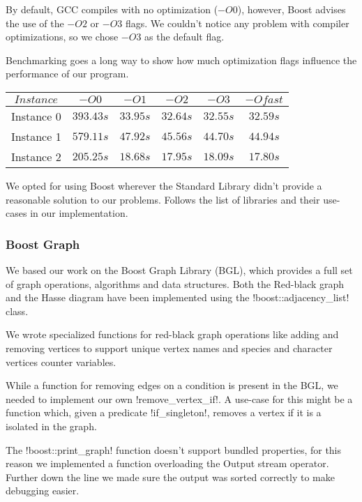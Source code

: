 
By default, GCC compiles with no optimization ($-O0$), however, Boost advises the use of the $-O2$ or $-O3$ flags.
We couldn't notice any problem with compiler optimizations, so we chose $-O3$ as the default flag.

Benchmarking goes a long way to show how much optimization flags influence the performance of our program.

\begin{center}
  \begin{tabular}{c | c c c c c}
    $Instance$ & $-O0$     & $-O1$    & $-O2$    & $-O3$    & $-Ofast$ \\
    \hline
    Instance 0 & $393.43s$ & $33.95s$ & $32.64s$ & $32.55s$ & $32.59s$ \\
    Instance 1 & $579.11s$ & $47.92s$ & $45.56s$ & $44.70s$ & $44.94s$ \\
    Instance 2 & $205.25s$ & $18.68s$ & $17.95s$ & $18.09s$ & $17.80s$
  \end{tabular}
\end{center}

We opted for using Boost wherever the Standard Library didn't provide a reasonable solution to our problems.
Follows the list of libraries and their use-cases in our implementation.

\subsubsection*{Boost Graph}

We based our work on the Boost Graph Library (BGL), which provides a full set of graph operations, algorithms and data structures.
Both the Red-black graph and the Hasse diagram have been implemented using the !boost::adjacency_list! class.

We wrote specialized functions for red-black graph operations like adding and removing vertices to support unique vertex names and species and character vertices counter variables.

While a function for removing edges on a condition is present in the BGL, we needed to implement our own !remove_vertex_if!.
A  use-case for this might be a function which, given a predicate !if_singleton!, removes a vertex if it is a isolated in the graph.

The !boost::print_graph! function doesn't support bundled properties, for this reason we implemented a function overloading the Output stream operator.
Further down the line we made sure the output was sorted correctly to make debugging easier.

